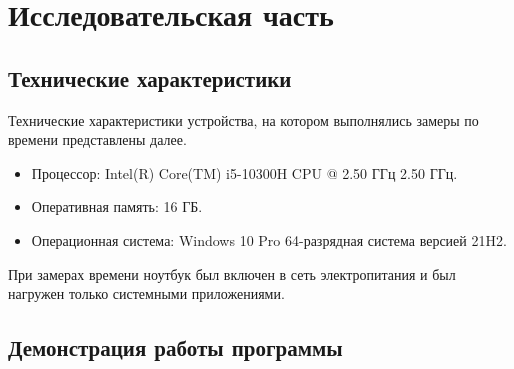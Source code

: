 \chapter{Исследовательская часть}

\section{Технические характеристики}

Технические характеристики устройства, на котором выполнялись замеры по времени представлены далее.

\begin{itemize}
	\item Процессор: Intel(R) Core(TM) i5-10300H CPU @ 2.50 ГГц 2.50 ГГц. \cite{intel}
	\item Оперативная память: 16 ГБ.
	\item Операционная система: Windows 10 Pro 64-разрядная система версией 21H2. \cite{windows}
\end{itemize}

При замерах времени ноутбук был включен в сеть электропитания и был нагружен только системными приложениями.

\clearpage

\section{Демонстрация работы программы}

